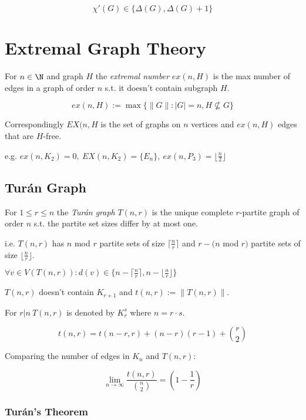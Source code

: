\[ \chi'(G) \in \{\Delta(G), \Delta(G)+1\} \]

\section*{Extremal Graph Theory}

For $n \in \N$ and graph $H$ the \emph{extremal number} $ex(n,H)$ is the max number of edges in a graph of order $n$ s.t. it doesn't contain subgraph $H$.

\vspace*{-3mm}
\[ ex(n,H):=\max\{\|G\| : |G|=n, H \not\subseteq G\} \]

Correspondingly $EX(n,H$ is the set of graphs on $n$ vertices and $ex(n,H)$ edges that are $H$-free.

\spacing

e.g. $ex(n,K_2) = 0, \ EX(n,K_2) = \{E_n\}, \ ex(n,P_3)=\lfloor\frac{n}{2}\rfloor$

\subsection*{Tur\'{a}n Graph}

For $1 \leq r \leq n$ the \emph{Tur\'{a}n graph} $T(n,r)$ is the unique complete $r$-partite graph of order $n$ s.t. the partite set sizes differ by at most one.

\spacing

i.e. $T(n,r)$ has $n$ mod $r$ partite sets of size $\lceil\frac{n}{r}\rceil$ and $r - (n$ mod $r)$ partite sets of size $\lfloor\frac{n}{r}\rfloor$.

$\forall v \in V(T(n,r)) : d(v) \in \{ n - \lceil\frac{n}{r}\rceil, n - \lfloor\frac{n}{r}\rfloor \}$

\spacing

$T(n,r)$ doesn't contain $K_{r+1}$ and $t(n,r) := \|T(n,r)\|$.

For $r | n \ T(n,r)$ is denoted by $K_r^s$ where $n=r \cdot s$.

\[ t(n,r) = t(n-r,r)+(n-r)(r-1)+{r \choose 2} \]

\spacing

Comparing the number of edges in $K_n$ and $T(n,r)$:

\[ \lim_{n \to \infty} \frac{t(n,r)}{{n \choose 2}} = \left( 1-\frac{1}{r} \right) \]

\subsubsection*{Tur\'{a}n's Theorem}


